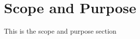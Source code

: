 \FloatBarrier
\section{Scope and Purpose} \label{sec:ScopeAndPurpose}
\FloatBarrier

This is the scope and purpose section